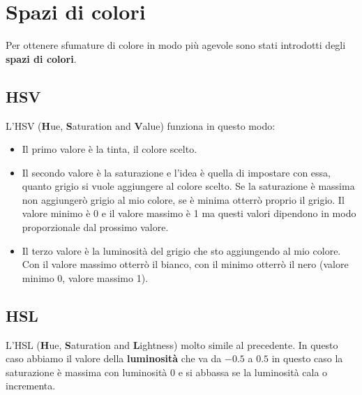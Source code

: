 \section{Spazi di colori}
Per ottenere sfumature di colore in modo pi\`u agevole sono stati introdotti
degli \textbf{spazi di colori}.

\subsection{HSV}
L'HSV (\textbf Hue, \textbf Saturation and \textbf Value) funziona in questo modo:
\begin{itemize}
	\item Il primo valore \`e la tinta, il colore scelto.
	\item Il secondo valore \`e la saturazione e l'idea \`e quella di impostare con essa,
	      quanto grigio si vuole aggiungere al colore scelto. Se la saturazione \`e
	      massima non aggiunger\`o grigio al mio colore, se \`e minima otterr\`o proprio
	      il grigio. Il valore minimo \`e 0 e il valore massimo \`e 1 ma questi valori
	      dipendono in modo proporzionale dal prossimo valore.
	\item Il terzo valore \`e la luminosit\`a del grigio che sto aggiungendo al mio colore.
	      Con il valore massimo otterr\`o il bianco, con il minimo otterr\`o il nero
	      (valore minimo 0, valore massimo 1).
\end{itemize}

\subsection{HSL}
L'HSL (\textbf Hue, \textbf Saturation and \textbf Lightness) molto simile al precedente. In
questo caso abbiamo il valore della \textbf{luminosit\`a} che va da $-0.5$ a $0.5$ in questo
caso la saturazione \`e massima con luminosit\`a 0 e si abbassa se la luminosit\`a cala o
incrementa.